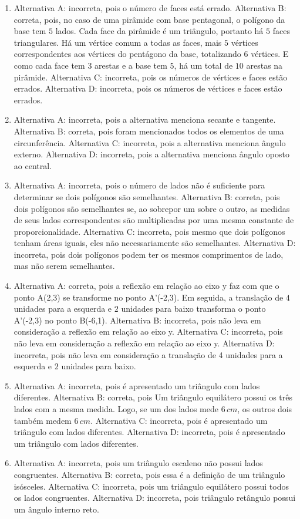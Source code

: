 \begin{enumerate}
\item Alternativa A: incorreta, pois o número de faces está errado.
Alternativa B: correta, pois, no caso de uma pirâmide com base
pentagonal, o polígono da base tem $5$ lados. Cada face da pirâmide é um
triângulo, portanto há $5$ faces triangulares. Há um vértice comum a todas
as faces, mais $5$ vértices correspondentes aos vértices do pentágono da
base, totalizando $6$ vértices. E como cada face tem $3$ arestas e a base
tem $5$, há um total de $10$ arestas na pirâmide.
Alternativa C: incorreta, pois os números de vértices e faces estão
errados.
Alternativa D: incorreta, pois os números de vértices e faces estão
errados.
\item Alternativa A: incorreta, pois a alternativa menciona secante e
tangente.
Alternativa B: correta, pois foram mencionados todos os elementos de uma
circunferência.
Alternativa C: incorreta, pois a alternativa menciona ângulo externo.
Alternativa D: incorreta, pois a alternativa menciona ângulo oposto ao
central.
\item Alternativa A: incorreta, pois o número de lados não é suficiente para
determinar se dois polígonos são semelhantes.
Alternativa B: correta, pois dois polígonos são semelhantes se, ao
sobrepor um sobre o outro, as medidas de seus lados correspondentes são
multiplicadas por uma mesma constante de proporcionalidade.
Alternativa C: incorreta, pois mesmo que dois polígonos tenham áreas
iguais, eles não necessariamente são semelhantes.
Alternativa D: incorreta, pois dois polígonos podem ter os mesmos
comprimentos de lado, mas não serem semelhantes.
\item Alternativa A: correta, pois a reflexão em relação ao eixo y faz com que
o ponto A(2,3) se transforme no ponto A'(-2,3). Em seguida, a translação
de $4$ unidades para a esquerda e $2$ unidades para baixo transforma o ponto
A'(-2,3) no ponto B(-6,1).
Alternativa B: incorreta, pois não leva em consideração a reflexão em
relação ao eixo y.
Alternativa C: incorreta, pois não leva em consideração a reflexão em
relação ao eixo y.
Alternativa D: incorreta, pois não leva em consideração a translação de
4 unidades para a esquerda e $2$ unidades para baixo.
\item Alternativa A: incorreta, pois é apresentado um triângulo com lados
diferentes.
Alternativa B: correta, pois Um triângulo equilátero possui os três
lados com a mesma medida. Logo, se um dos lados mede $6\,cm$, os outros dois
também medem $6\,cm$.
Alternativa C: incorreta, pois é apresentado um triângulo com lados
diferentes.
Alternativa D: incorreta, pois é apresentado um triângulo com lados
diferentes.
\item Alternativa A: incorreta, pois um triângulo escaleno não possui lados
congruentes.
Alternativa B: correta, pois essa é a definição de um triângulo
isósceles.
Alternativa C: incorreta, pois um triângulo equilátero possui todos os
lados congruentes.
Alternativa D: incorreta, pois triângulo retângulo possui um ângulo
interno reto.
\end{enumerate}

